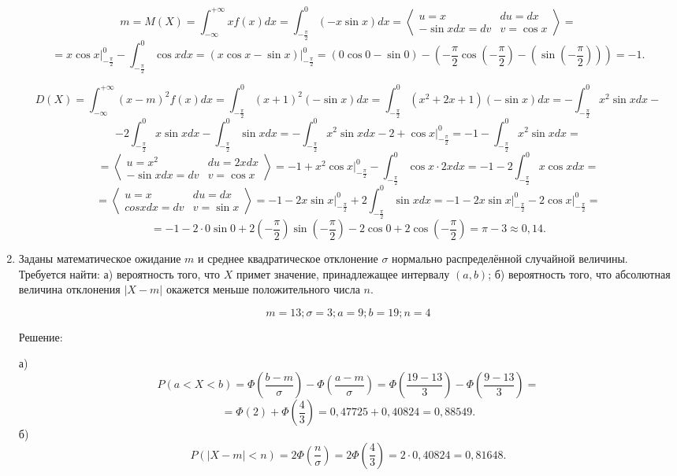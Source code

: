 \documentclass{article}
\begin{document}
\begin{enumerate}
$$m=M(X)=\int_{-\infty}^{+\infty} x f(x) dx=\int_{-\frac{\pi}{2}}^{0} \left(-x\sin{x}\right) dx=\left\langle \begin{array}{cc} u=x & du=dx \\ -\sin{x}dx=dv & v=\cos{x} \end{array} \right\rangle=$$ $$=x\cos{x}\bigg|_{-\frac{\pi}{2}}^{0}-\int_{-\frac{\pi}{2}}^{0} \cos{x} dx=\left(x\cos{x}-\sin{x}\right)\bigg|_{-\frac{\pi}{2}}^{0}=
\left(0\cos{0}-\sin{0}\right)-\left(-\frac{\pi}{2}\cos{\left(-\frac{\pi}{2}\right)}-\left(\sin{\left(-\frac{\pi}{2}\right)}\right)\right)=-1.$$

$$D(X)=\int_{-\infty}^{+\infty} (x-m)^2 f(x) dx=\int_{-\frac{\pi}{2}}^{0} \left(x+1\right)^2(-\sin{x}) dx
=\int_{-\frac{\pi}{2}}^{0} \left(x^2+2x+1\right)(-\sin{x}) dx=-\int_{-\frac{\pi}{2}}^{0} x^2\sin{x} dx-$$
$$-2\int_{-\frac{\pi}{2}}^{0} x\sin{x} dx-\int_{-\frac{\pi}{2}}^{0} \sin{x} dx=-\int_{-\frac{\pi}{2}}^{0} x^2\sin{x} dx-2+\cos{x}\bigg|_{-\frac{\pi}{2}}^{0}=-1-\int_{-\frac{\pi}{2}}^{0} x^2\sin{x} dx=$$
$$=\left\langle \begin{array}{cc} u=x^2 & du=2xdx \\ -\sin{x}dx=dv & v=\cos{x} \end{array} \right\rangle=-1+x^2\cos{x}\bigg|_{-\frac{\pi}{2}}^{0}-\int_{-\frac{\pi}{2}}^{0}\cos{x}\cdot2xdx=-1-2\int_{-\frac{\pi}{2}}^{0}x\cos{x}dx=$$
$$=\left\langle \begin{array}{cc} u=x & du=dx \\ cos{x}dx=dv & v=\sin{x} \end{array} \right\rangle=-1-2x\sin{x}\bigg|_{-\frac{\pi}{2}}^{0}+2\int_{-\frac{\pi}{2}}^{0}\sin{x}dx=-1-2x\sin{x}\bigg|_{-\frac{\pi}{2}}^{0}-2\cos{x}\bigg|_{-\frac{\pi}{2}}^{0}=$$
$$=-1-2\cdot0\sin{0}+2\left(-\frac{\pi}{2}\right)\sin{\left(-\frac{\pi}{2}\right)}-2\cos{0}+2\cos{\left(-\frac{\pi}{2}\right)}=\pi-3\approx0,14.$$

\item %
Заданы математическое ожидание $m$ и среднее квадратическое отклонение $\sigma$ нормально распределённой случайной величины. \newline
Требуется найти: а) вероятность того, что $X$ примет значение, принадлежащее интервалу $(a, b)$; \newline
б) вероятность того, что абсолютная величина отклонения $|X-m|$ окажется меньше положительного числа $n$.

$$m=13;\sigma=3;a=9;b=19;n=4$$
\begin{center}Решение:\end{center}
а) $$P(a<X<b)=\Phi\left(\frac{b-m}{\sigma}\right)-\Phi\left(\frac{a-m}{\sigma}\right)=\Phi\left(\frac{19-13}{3}\right)-\Phi\left(\frac{9-13}{3}\right)=$$
$$=\Phi(2)+\Phi\left(\frac{4}{3}\right)=0,47725+0,40824=0,88549.$$
б)
$$P (|X-m| < n)= 2\Phi\left(\frac{n}{\sigma}\right)=2\Phi\left(\frac{4}{3}\right)=2\cdot0,40824=0,81648.$$


\end{enumerate}
\end{document}
